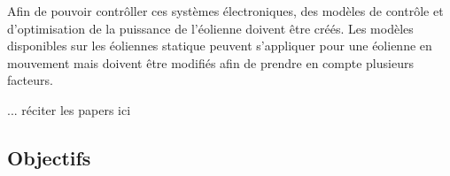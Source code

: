 Afin de pouvoir contrôller ces systèmes électroniques, des modèles de contrôle et d'optimisation de la puissance de l'éolienne doivent être créés. Les modèles disponibles sur les éoliennes statique peuvent s'appliquer pour une éolienne en mouvement mais doivent être modifiés afin de prendre en compte plusieurs facteurs.

... réciter les papers ici

\subsection{Objectifs} %
\label{sub:Objectifs}


